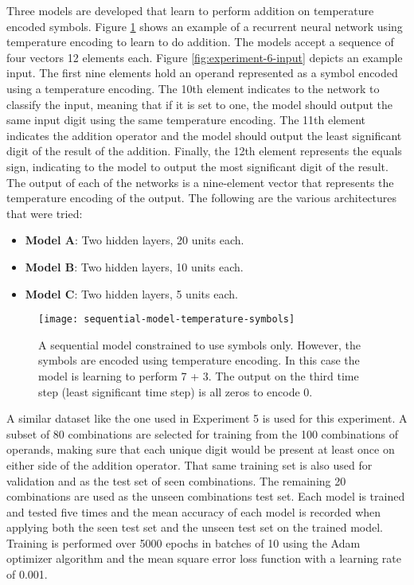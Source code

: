 Three models are developed that learn to perform addition on temperature encoded symbols. Figure \ref{fig:sequential-model-temperature-symbols} shows an example of a recurrent neural network using temperature encoding to learn to do addition. The models accept a sequence of four vectors 12 elements each. Figure \ref{fig:experiment-6-input} depicts an example input. The first nine elements hold an operand represented as a symbol encoded using a temperature encoding. The 10th element indicates to the network to classify the input, meaning that if it is set to one, the model should output the same input digit using the same temperature encoding. The 11th element indicates the addition operator and the model should output the least significant digit of the result of the addition. Finally, the 12th element represents the equals sign, indicating to the model to output the most significant digit of the result. The output of each of the networks is a nine-element vector that represents the temperature encoding of the output. The following are the various architectures that were tried:
\begin{itemize}
	\item \textbf{Model A}: Two hidden layers, 20 units each.
	\item \textbf{Model B}: Two hidden layers, 10 units each.
	\item \textbf{Model C}: Two hidden layers, 5 units each.
\end{itemize}

\begin{figure}
	\centering
	\texttt{[image: sequential-model-temperature-symbols]}
	\caption{A sequential model constrained to use symbols only. However, the symbols are encoded using temperature encoding. In this case the model is learning to perform 7 + 3. The output on the third time step (least significant time step) is all zeros to encode 0.}
	\label{fig:sequential-model-temperature-symbols}
\end{figure}

A similar dataset like the one used in Experiment 5 is used for this experiment. A subset of 80 combinations are selected for training from the 100 combinations of operands, making sure that each unique digit would be present at least once on either side of the addition operator. That same training set is also used for validation and as the test set of seen combinations. The remaining 20 combinations are used as the unseen combinations test set. Each model is trained and tested five times and the mean accuracy of each model is recorded when applying both the seen test set and the unseen test set on the trained model. Training is performed over 5000 epochs in batches of 10 using the Adam optimizer algorithm and the mean square error loss function with a learning rate of 0.001. 

